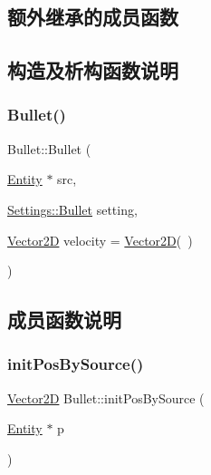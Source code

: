 \subsection*{额外继承的成员函数}


\subsection{构造及析构函数说明}
\mbox{\label{class_bullet_ae9b56731be2ca3ff77f3a3ee4eb0bd25}} 
\subsubsection{\texorpdfstring{Bullet()}{Bullet()}}
{\footnotesize\ttfamily Bullet\+::\+Bullet (\begin{DoxyParamCaption}\item[{\hyperlink{class_entity}{Entity} $\ast$}]{src,  }\item[{\hyperlink{struct_settings_1_1_bullet}{Settings\+::\+Bullet}}]{setting,  }\item[{\hyperlink{_vector2_d_8hpp_aa1f1145650f1dd9bddf7335ec6434d7c}{Vector2D}}]{velocity = {\ttfamily \hyperlink{_vector2_d_8hpp_aa1f1145650f1dd9bddf7335ec6434d7c}{Vector2D}(~)} }\end{DoxyParamCaption})}



\subsection{成员函数说明}
\mbox{\label{class_bullet_ac8350c88346ae354e7144fa20b6cb2a2}} 
\subsubsection{\texorpdfstring{init\+Pos\+By\+Source()}{initPosBySource()}}
{\footnotesize\ttfamily \hyperlink{_vector2_d_8hpp_aa1f1145650f1dd9bddf7335ec6434d7c}{Vector2D} Bullet\+::init\+Pos\+By\+Source (\begin{DoxyParamCaption}\item[{\hyperlink{class_entity}{Entity} $\ast$}]{p }\end{DoxyParamCaption})\hspace{0.3cm}{\ttfamily [private]}}

